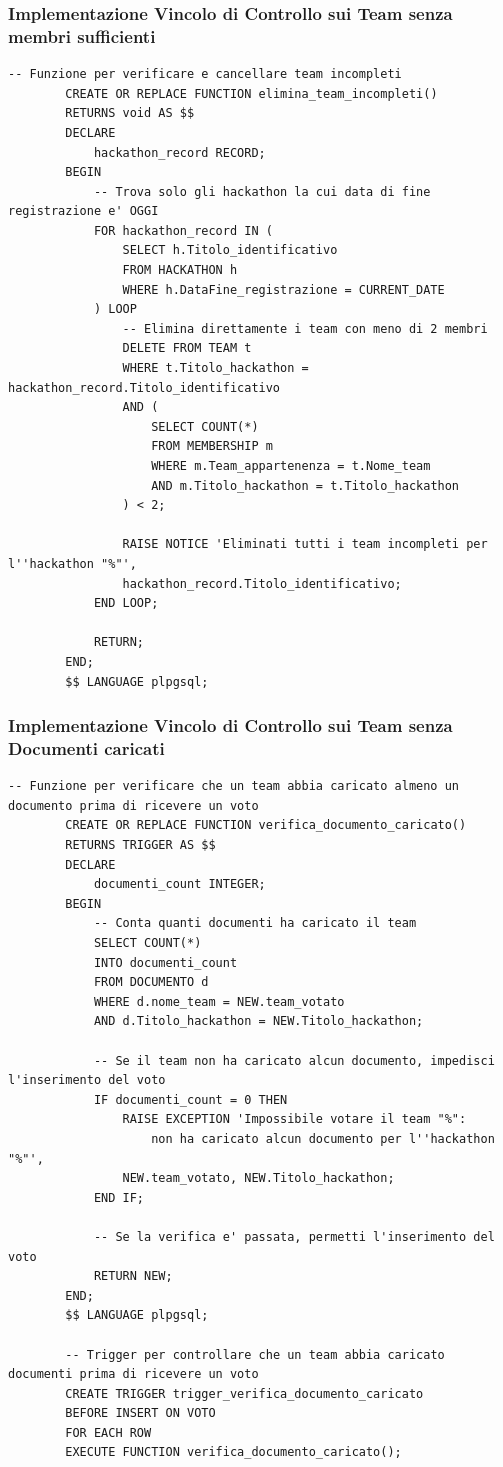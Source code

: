 \documentclass[a4paper, 11pt]{article}
\begin{document}
	\subsubsection{Implementazione Vincolo di Controllo sui Team senza membri sufficienti}
	\begin{lstlisting}[style=sqlstyle]
		-- Funzione per verificare e cancellare team incompleti
		CREATE OR REPLACE FUNCTION elimina_team_incompleti()
		RETURNS void AS $$
		DECLARE
			hackathon_record RECORD;
		BEGIN
			-- Trova solo gli hackathon la cui data di fine registrazione e' OGGI
			FOR hackathon_record IN (
				SELECT h.Titolo_identificativo 
				FROM HACKATHON h 
				WHERE h.DataFine_registrazione = CURRENT_DATE
			) LOOP
				-- Elimina direttamente i team con meno di 2 membri
				DELETE FROM TEAM t
				WHERE t.Titolo_hackathon = hackathon_record.Titolo_identificativo
				AND (
					SELECT COUNT(*) 
					FROM MEMBERSHIP m 
					WHERE m.Team_appartenenza = t.Nome_team 
					AND m.Titolo_hackathon = t.Titolo_hackathon
				) < 2;
				
				RAISE NOTICE 'Eliminati tutti i team incompleti per l''hackathon "%"', 
				hackathon_record.Titolo_identificativo;
			END LOOP;
			
			RETURN;
		END;
		$$ LANGUAGE plpgsql;
	\end{lstlisting}
	\subsubsection{Implementazione Vincolo di Controllo sui Team senza Documenti caricati}
	\begin{lstlisting}[style=sqlstyle]
		-- Funzione per verificare che un team abbia caricato almeno un documento prima di ricevere un voto
		CREATE OR REPLACE FUNCTION verifica_documento_caricato()
		RETURNS TRIGGER AS $$
		DECLARE
			documenti_count INTEGER;
		BEGIN
			-- Conta quanti documenti ha caricato il team
			SELECT COUNT(*)
			INTO documenti_count
			FROM DOCUMENTO d
			WHERE d.nome_team = NEW.team_votato
			AND d.Titolo_hackathon = NEW.Titolo_hackathon;
			
			-- Se il team non ha caricato alcun documento, impedisci l'inserimento del voto
			IF documenti_count = 0 THEN
				RAISE EXCEPTION 'Impossibile votare il team "%": 
					non ha caricato alcun documento per l''hackathon "%"',
				NEW.team_votato, NEW.Titolo_hackathon;
			END IF;
			
			-- Se la verifica e' passata, permetti l'inserimento del voto
			RETURN NEW;
		END;
		$$ LANGUAGE plpgsql;
		
		-- Trigger per controllare che un team abbia caricato documenti prima di ricevere un voto
		CREATE TRIGGER trigger_verifica_documento_caricato
		BEFORE INSERT ON VOTO
		FOR EACH ROW
		EXECUTE FUNCTION verifica_documento_caricato();
	\end{lstlisting}
\end{document}
